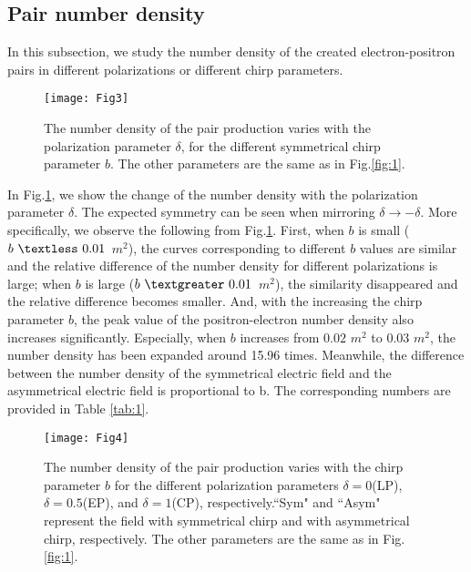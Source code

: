 \documentclass[aps,preprint,superscriptaddress]{revtex4}
\begin{document}
\subsection{Pair number density}
In this subsection, we study the number density of the created electron-positron pairs in different polarizations or different chirp parameters.
\begin{figure}[htbp]%
\begin{center}
\texttt{[image: Fig3]}
\end{center}
\vspace{-10mm}
\caption{The number density of the pair production varies with the polarization parameter $\delta$, for the different symmetrical chirp parameter $ b $. The other parameters are the same as in Fig.\ref {fig:1}.}
\label{fig:2}
\end{figure}
In Fig.\ref{fig:2}, we show the change of the number density with the polarization parameter $\delta$. The expected symmetry can be seen when mirroring $\delta \to -\delta$. More specifically, we observe the following from Fig.\ref{fig:2}. First, when $b$ is small ($b~\textless ~0.01$~$m^2$), the curves corresponding to different $b$ values are similar and the relative difference of the number density for different polarizations is large; when $b$ is large ($b~\textgreater ~0.01$~$m^2$), the similarity disappeared and the relative difference becomes smaller. And, with the increasing the chirp parameter $b$, the peak value of the positron-electron number density also increases significantly. Especially, when $b$ increases from $0.02$ $m^2$ to $0.03$ $m^2$, the number density has been expanded around 15.96 times. Meanwhile, the difference between the number density of the symmetrical electric field and the asymmetrical electric field is proportional to b. The corresponding numbers are provided in Table \ref{tab:1}.

\begin{figure}[htb]%
\begin{center}
\texttt{[image: Fig4]}\\

\end{center}
\vspace{-10mm}
\caption{The number density of the pair production varies with the chirp parameter $b$ for the different polarization parameters $\delta=0$(LP), $\delta=0.5$(EP), and $\delta=1$(CP), respectively.``Sym" and ``Asym" represent the field with symmetrical chirp and with asymmetrical chirp, respectively. The other parameters are the same as in Fig.\ref {fig:1}.}
\label{fig:3}
\end{figure}
\end{document}
